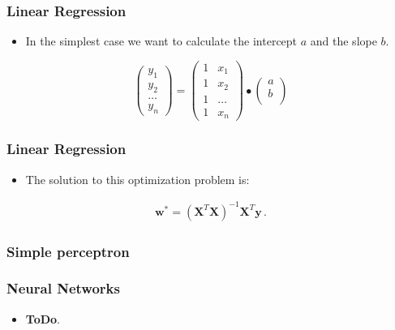 \documentclass[handout]{beamer}
\begin{document}
\begin{frame}[fragile]
    \frametitle{Linear Regression}
    \Large
    \begin{itemize}
        \item In the simplest case we want to calculate the intercept $a$ and the slope $b$.
    \end{itemize}
    \[ 
    \left(
    \begin{array}{c}
        y_1 \\
        y_2 \\
        \ldots \\
        y_n 
    \end{array}
    \right)
    = 
    \left(
    \begin{array}{ccc}
        1 & x_1 \\
        1 & x_2 \\
        1 & \ldots \\
        1 & x_n 
    \end{array}
    \right)
    \bullet
    \left(
    \begin{array}{ccc}
        a \\
        b \\
    \end{array}
    \right)
    \] 
\end{frame}


\begin{frame}[fragile]
    \frametitle{Linear Regression}
    \Large
    \begin{itemize}
        \item The solution to this optimization problem is:
    \end{itemize}
    \begin{align*}
        \boldsymbol{w^{*}} = (\boldsymbol{X}^T\boldsymbol{X})^{-1}\boldsymbol{X}^{T}\boldsymbol{y}\,.
    \end{align*}
\end{frame}


\begin{frame}[fragile]\frametitle{Simple perceptron}
  \begin{figure}[htb]
        \centering
        
        \label{fig:perceptron}
	\end{figure}
\end{frame}

\begin{frame}[fragile]\frametitle{Neural Networks}
    \begin{itemize}
        \item \textbf{ToDo}.
    \end{itemize}
\end{frame}
\end{document}
